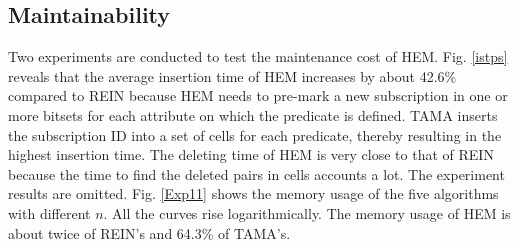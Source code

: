 \documentclass[runningheads]{llncs}
\begin{document}


\subsection{Maintainability}
Two experiments are conducted to test the maintenance cost of HEM.
Fig. \ref{istps} reveals that the average insertion time of HEM increases by about 42.6\% compared to REIN because HEM needs to pre-mark a new subscription in one or more bitsets for each attribute on which the predicate is defined.
TAMA inserts the subscription ID into a set of cells for each predicate, thereby resulting in the highest insertion time.
The deleting time of HEM is very close to that of REIN because the time to find the deleted pairs in cells accounts a lot. The experiment results are omitted.
Fig. \ref{Exp11} shows the memory usage of the five algorithms with different $n$. 
All the curves rise logarithmically. The memory usage of HEM is about twice of REIN's and 64.3\% of TAMA's.
\end{document}

